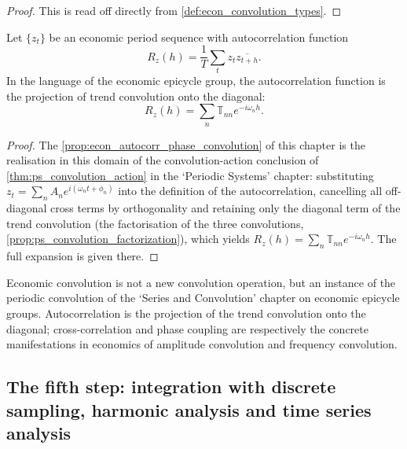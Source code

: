 \begin{proof}
This is read off directly from \cref{def:econ_convolution_types}.
\end{proof}

\begin{proposition}\label{prop:econ_autocorr_phase_convolution}
Let $\{z_t\}$ be an economic period sequence with autocorrelation function
\[
R_z(h)=\frac1T\sum_t z_t\overline{z_{t+h}}.
\]
In the language of the economic epicycle group, the autocorrelation function is the projection of trend convolution onto the diagonal:
\[
R_z(h)=\sum_n\mathbb T_{nn}e^{-i\omega_n h}.
\]
\end{proposition}

\begin{proof}
The \cref{prop:econ_autocorr_phase_convolution} of this chapter is the realisation in this domain of the convolution-action conclusion of \cref{thm:ps_convolution_action} in the `Periodic Systems' chapter:
substituting $z_t=\sum_n A_n e^{i(\omega_n t+\phi_n)}$ into the definition of the autocorrelation, cancelling all off-diagonal cross terms by orthogonality and retaining only the diagonal term of the trend convolution
(the factorisation of the three convolutions, \cref{prop:ps_convolution_factorization}), which yields $R_z(h)=\sum_n\mathbb T_{nn}e^{-i\omega_n h}$.
The full expansion is given there.
\end{proof}

\begin{remark}\label{rem:econ_convolution_relation}
Economic convolution is not a new convolution operation, but an instance of the periodic convolution of the `Series and Convolution' chapter on economic epicycle groups. Autocorrelation is the projection of the trend convolution onto the diagonal; cross-correlation and phase coupling are respectively the concrete manifestations in economics of amplitude convolution and frequency convolution.
\end{remark}

\subsection{The fifth step: integration with discrete sampling, harmonic analysis and time series analysis}

